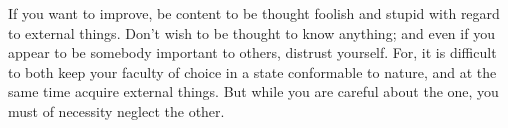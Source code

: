If you want to improve, be content to be thought foolish and stupid with regard
to external things. Don't wish to be  thought to know anything; and even if you
appear  to be  somebody  important to  others, distrust  yourself.  For, it  is
difficult to both keep your faculty of choice in a state conformable to nature,
and at the same  time acquire external things. But while  you are careful about
the one, you must of necessity neglect the other.
